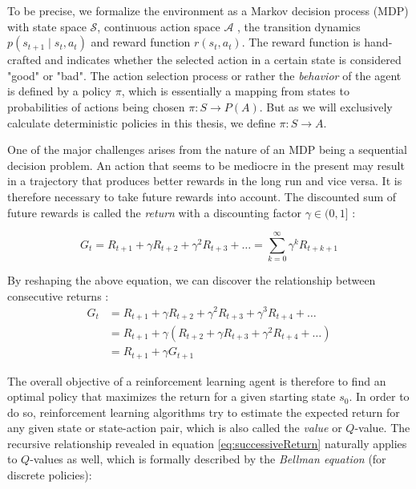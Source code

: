 To be precise, we formalize the environment as a Markov decision process (MDP) with state space $\mathcal{S}$, continuous action space $\mathcal{A}$ , the transition dynamics $p(s_{t+1} \mid s_t, a_t)$ and reward function $r(s_t, a_t)$. The reward function is hand-crafted and indicates whether the selected action in a certain state is considered "good" or "bad". The action selection process or rather the \textit{behavior} of the agent is defined by a policy $\pi$, which is essentially a mapping from states to probabilities of actions being chosen $\pi: S \rightarrow P(A)$. But as we will exclusively calculate deterministic policies in this thesis, we define $\pi: S \rightarrow A$.
\par 
One of the major challenges arises from the nature of an MDP being a sequential decision problem. An action that seems to be mediocre in the present may result in a trajectory that produces better rewards in the long run and vice versa. It is therefore necessary to take future rewards into account. The discounted sum of future rewards is called the \textit{return} with a discounting factor $\gamma \in (0,1]$  \cite[p.55]{Sutton1998}:

\begin{equation}\label{eq:discountedReturn}
    G_t = R_{t+1} + \gamma R_{t+2} + \gamma^2 R_{t+3} + \dots  = \sum_{k=0}^\infty{\gamma^k R_{t+k+1}}
\end{equation}

By reshaping the above equation, we can discover the relationship between consecutive returns \cite[p.55]{Sutton1998}:
\begin{equation}\label{eq:successiveReturn}
    \begin{aligned}
    G_t &= R_{t+1} + \gamma R_{t+2} + \gamma^2 R_{t+3} + \gamma^3 R_{t+4} + \dots \\
    &= R_{t+1} + \gamma (R_{t+2} + \gamma R_{t+3} + \gamma^2 R_{t+4} + \dots)  \\
   & = R_{t+1} + \gamma G_{t+1}
    \end{aligned}
\end{equation}

The overall objective of a reinforcement learning agent is therefore to find an optimal policy that maximizes the return for a given starting state $s_0$. In order to do so, reinforcement learning algorithms try to estimate the expected return for any given state or state-action pair, which is also called the \textit{value} or $Q$-value. The recursive relationship revealed in equation \ref{eq:successiveReturn} naturally applies to $Q$-values as well, which is formally described by the \textit{Bellman equation} (for discrete policies):

